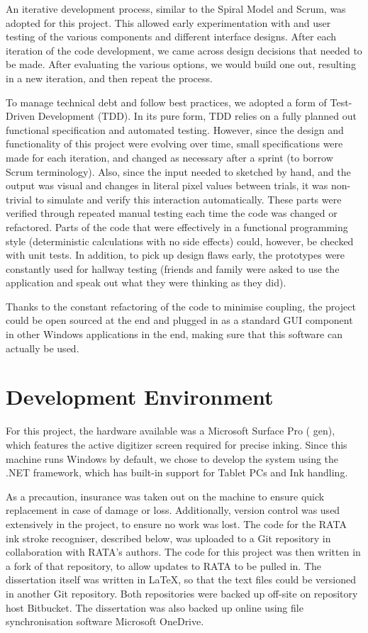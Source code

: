 	An iterative development process, similar to the Spiral Model and Scrum, was adopted for this project. This allowed early experimentation with and user testing of the various components and different interface designs. After each iteration of the code development, we came across design decisions that needed to be made. After evaluating the various options, we would build one out, resulting in a new iteration, and then repeat the process.
	
	To manage technical debt and follow best practices, we adopted a form of Test-Driven Development (TDD). In its pure form, TDD relies on a fully planned out functional specification and automated testing. However, since the design and functionality of this project were evolving over time, small specifications were made for each iteration, and changed as necessary after a sprint (to borrow Scrum terminology). Also, since the input needed to sketched by hand, and the output was visual and changes in literal pixel values between trials, it was non-trivial to simulate and verify this interaction automatically. These parts were verified through repeated manual testing each time the code was changed or refactored. Parts of the code that were effectively in a functional programming style (deterministic calculations with no side effects) could, however, be checked with unit tests. In addition, to pick up design flaws early, the prototypes were constantly used for hallway testing (friends and family were asked to use the application and speak out what they were thinking as they did).
	
	Thanks to the constant refactoring of the code to minimise coupling, the project could be open sourced at the end and plugged in as a standard GUI component in other Windows applications in the end, making sure that this software can actually be used.
	
	
	
	
	
	\section{Development Environment}
	For this project, the hardware available was a Microsoft Surface Pro ( gen), which features the active digitizer screen required for precise inking. Since this machine runs Windows by default, we chose to develop the system using the .NET framework, which has built-in support for Tablet PCs and Ink handling.
	
	As a precaution, insurance was taken out on the machine to ensure quick replacement in case of damage or loss. Additionally, version control was used extensively in the project, to ensure no work was lost. The code for the RATA ink stroke recogniser, described below, was uploaded to a Git repository in collaboration with RATA's authors. The code for this project was then written in a fork of that repository, to allow updates to RATA to be pulled in. The dissertation itself was written in \LaTeX , so that the text files could be versioned in another Git repository. Both repositories were backed up off-site on repository host Bitbucket. The dissertation was also backed up online using file synchronisation software Microsoft OneDrive. 
	
